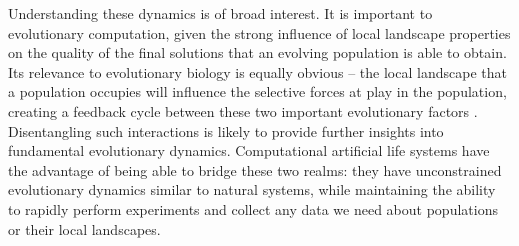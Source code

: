 \documentclass[letterpaper]{article}
\begin{document}
Understanding these dynamics is of broad interest.  It is important to evolutionary computation, given the strong influence of local landscape properties on the quality of the final solutions that an evolving population is able to obtain. Its relevance to evolutionary biology is equally obvious -- the local landscape that a population occupies will influence the selective forces at play in the population, creating a feedback cycle between these two important evolutionary factors \citep{zaman_coevolution_2014,meyer_repeatability_2012}. Disentangling such interactions is likely to provide further insights into fundamental evolutionary dynamics.  Computational artificial life systems have the advantage of being able to bridge these two realms: they have unconstrained evolutionary dynamics similar to natural systems, while maintaining the ability to rapidly perform experiments and collect any data we need about populations or their local landscapes.
%
%
%
%
%
%
\end{document}

